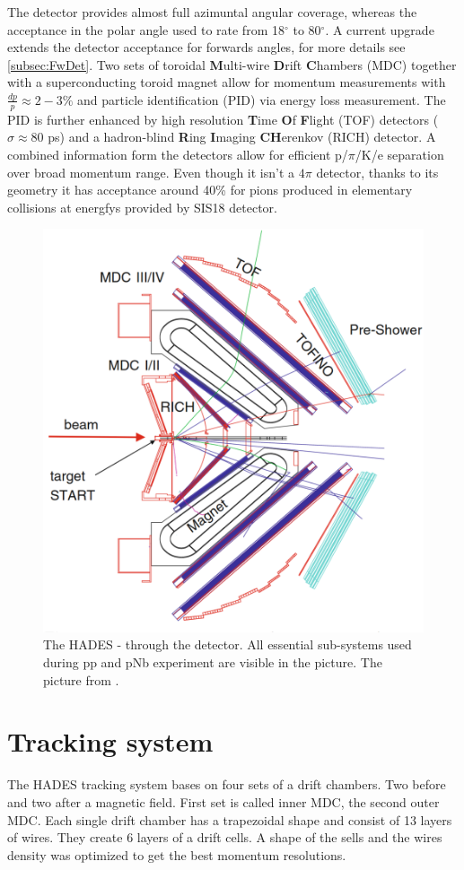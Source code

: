 The detector provides almost full azimuntal angular coverage, whereas the acceptance in the polar angle used to rate from 18$^{\circ}$  to 80$^{\circ}$. A current upgrade extends the detector acceptance for forwards angles, for more details see \ref{subsec:FwDet}. Two sets of toroidal \textbf{M}ulti-wire \textbf{D}rift \textbf{C}hambers (MDC) together with a superconducting toroid magnet allow for momentum measurements with $\frac{dp}{p} \approx 2-3\%$ and particle identification (PID) via energy loss measurement. The PID is further enhanced by high resolution \textbf{T}ime \textbf{O}f \textbf{F}light (TOF) detectors ($\sigma \approx 80$ ps) and a hadron-blind \textbf{R}ing \textbf{I}maging \textbf{CH}erenkov (RICH) detector. A combined information form the detectors allow for efficient p/$\pi$/K/e separation over broad momentum range. Even though it isn't a $4 \pi$ detector, thanks to its geometry it has acceptance around 40\% for pions produced in elementary collisions at energfys provided by SIS18 detector.
\begin{figure}
  \centering
  \includegraphics[width=0.7 \linewidth]{Chapter_detector/detektor.eps}
  \caption{The HADES - \cs through the detector. All essential sub-systems used during pp and pNb experiment are visible in the picture. The picture from \cite{Agakishiev:2009am}.}
\end{figure}

\section{Tracking system}
The HADES tracking system bases on four sets of a drift chambers. Two before and two after a magnetic field. First set is called inner MDC, the second outer MDC. Each single drift chamber has a trapezoidal shape and consist of 13 layers of wires. They create 6 layers of a drift cells. A shape of the sells and the wires density was optimized to get the best momentum resolutions.

